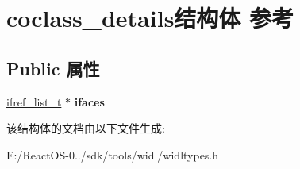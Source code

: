 \hypertarget{structcoclass__details}{}\section{coclass\+\_\+details结构体 参考}
\label{structcoclass__details}
\subsection*{Public 属性}
\begin{DoxyCompactItemize}
\item 
\mbox{\label{structcoclass__details_ac568678850fed46ab466506682149ab1}} 
\hyperlink{classlist}{ifref\+\_\+list\+\_\+t} $\ast$ {\bfseries ifaces}
\end{DoxyCompactItemize}


该结构体的文档由以下文件生成\+:\begin{DoxyCompactItemize}
\item 
E\+:/\+React\+O\+S-\/0../sdk/tools/widl/widltypes.\+h\end{DoxyCompactItemize}

